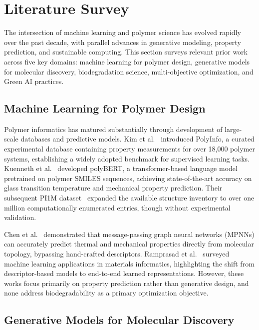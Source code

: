 \documentclass[twocolumn,10pt]{article}
\begin{document}
\section{Literature Survey}

The intersection of machine learning and polymer science has evolved rapidly over the past decade, with parallel advances in generative modeling, property prediction, and sustainable computing. This section surveys relevant prior work across five key domains: machine learning for polymer design, generative models for molecular discovery, biodegradation science, multi-objective optimization, and Green AI practices.

\subsection{Machine Learning for Polymer Design}

Polymer informatics has matured substantially through development of large-scale databases and predictive models. Kim et al.~\cite{kim2018polymer} introduced PolyInfo, a curated experimental database containing property measurements for over 18,000 polymer systems, establishing a widely adopted benchmark for supervised learning tasks. Kuenneth et al.~\cite{kuenneth2023polybert} developed polyBERT, a transformer-based language model pretrained on polymer SMILES sequences, achieving state-of-the-art accuracy on glass transition temperature and mechanical property prediction. Their subsequent PI1M dataset~\cite{kuenneth2023pi1m} expanded the available structure inventory to over one million computationally enumerated entries, though without experimental validation.

Chen et al.~\cite{chen2021polymer} demonstrated that message-passing graph neural networks (MPNNs) can accurately predict thermal and mechanical properties directly from molecular topology, bypassing hand-crafted descriptors. Ramprasad et al.~\cite{ramprasad2017machine} surveyed machine learning applications in materials informatics, highlighting the shift from descriptor-based models to end-to-end learned representations. However, these works focus primarily on property prediction rather than generative design, and none address biodegradability as a primary optimization objective.

\subsection{Generative Models for Molecular Discovery}
\end{document}

